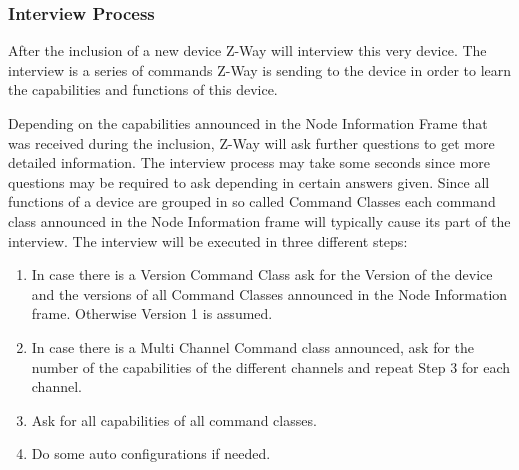 \subsubsection{Interview Process}
After the inclusion of a new device Z-Way will interview this very device. The interview is a series of commands Z-Way is sending 
to the device in order to learn the capabilities and functions of this device.


Depending on the capabilities announced in the Node Information Frame that was received during the inclusion, Z-Way will ask further 
questions to get more detailed information. The interview process may take some seconds since more questions may be required to ask depending in certain answers given.
Since all functions of a device are grouped in so called Command Classes each command class announced in the Node Information frame will typically cause its part of the interview.
The interview will be executed in three different steps:

\begin{enumerate}
\item In case there is a Version Command Class ask for the Version of the device and the versions of all Command Classes announced in the Node Information frame. Otherwise Version 1 is assumed.
\item In case there is a Multi Channel Command class announced, ask for the number of the capabilities of the different channels and repeat Step 3 for each channel.
\item Ask for all capabilities of all command classes.
\item Do some auto configurations if needed.
\end{enumerate}

